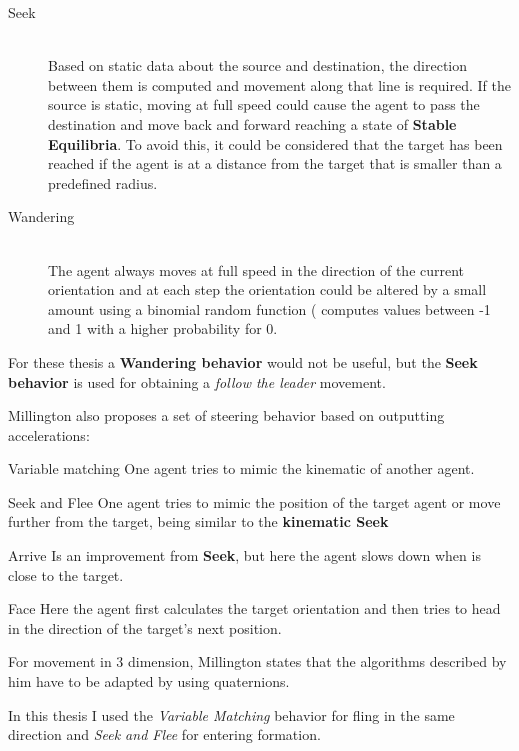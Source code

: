 \begin{description}
\item [Seek] \hfill \\ Based on static data about the source and destination, the direction
between them is computed and movement along that line is required. If the source
is static, moving at full speed could cause the agent to pass the destination
and move back and forward reaching a state of \textbf{Stable Equilibria}. To 
avoid this, it could be considered that the target has been reached if the 
agent is at a distance from the target that is smaller than a predefined
radius.
\item [Wandering] \hfill \\ The agent always moves at full speed in the direction
of the current orientation and at each step the orientation could be
altered by a small amount using a binomial random function ( computes values between
-1 and 1 with a higher probability for 0.
\end{description}

For these thesis a \textbf{Wandering behavior} would not be useful, but the 
\textbf{Seek behavior} is used for obtaining a \textit{follow the leader} movement.

Millington also proposes a set of steering behavior based on outputting accelerations:
\begin{description}
\item {Variable matching} One agent tries to mimic the kinematic of another agent.
\item {Seek and Flee} One agent tries to mimic the position of the target agent
or move further from the target, being similar to the \textbf{kinematic Seek}
\item {Arrive} Is an improvement from \textbf{Seek}, but here the agent slows 
down when is close to the target.
\item {Face} Here the agent first calculates the target orientation and then
tries to head in the direction of the target's next position.
\end{description}

For movement in 3 dimension, Millington states that the algorithms described by
him have to be adapted by using quaternions.

In this thesis I used the \textit{Variable Matching} behavior for fling in the
same direction and \textit{Seek and Flee} for entering formation.